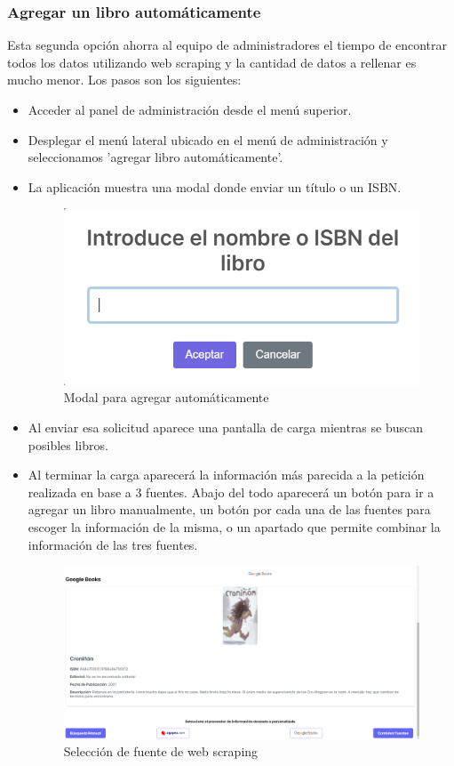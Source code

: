 \subsubsection{Agregar un libro automáticamente}
Esta segunda opción ahorra al equipo de administradores el tiempo de encontrar todos los datos utilizando web scraping y la cantidad de datos a rellenar es mucho menor.
Los pasos son los siguientes:

\begin{itemize}
    \item Acceder al panel de administración desde el menú superior.
    \item Desplegar el menú lateral ubicado en el menú de administración y seleccionamos 'agregar libro automáticamente'.
    \item La aplicación muestra una modal donde enviar un título o un ISBN.
    \begin{figure}[h]
        \centering
        \includegraphics[width=0.5\linewidth]{Imagenes/ManualModalAgregarAuto.png}
        \caption{Modal para agregar automáticamente}
        \label{Modal para agregar automáticamente}
    \end{figure}
    \FloatBarrier
    \item Al enviar esa solicitud aparece una pantalla de carga mientras se buscan posibles libros.
    \item Al terminar la carga aparecerá la información más parecida a la petición realizada en base a 3 fuentes. Abajo del todo aparecerá un botón para ir a agregar un libro manualmente, un botón por cada una de las fuentes para escoger la información de la misma, o un apartado que permite combinar la información de las tres fuentes.
    \begin{figure}[h]
        \centering
        \includegraphics[width=1\linewidth]{Imagenes/ManualSeleccionFuente.png}
        \caption{Selección de fuente de web scraping}
        \label{Selección de fuente de web scraping}
    \end{figure}
    \FloatBarrier


\end{itemize}
